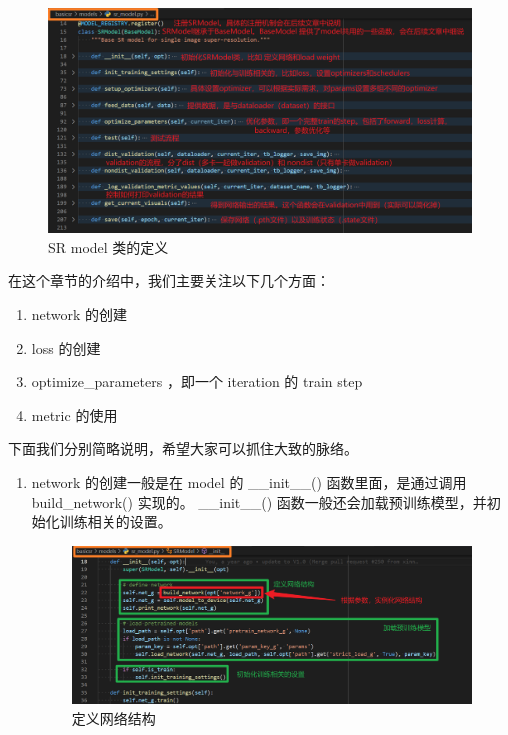 \documentclass[../main.tex]{subfiles}
\begin{document}
\begin{enumerate}
\begin{figure}[H]
\begin{center}
    \includegraphics[width=0.7\linewidth]{figures/getting_start_13.png}
    \caption{SR model 类的定义}
    \label{fig:getting_start_13}
\end{center}
\vspace{-0.5cm}
\end{figure}

在这个章节的介绍中，我们主要关注以下几个方面：

\begin{enumerate}
\item network 的创建
\item loss 的创建
\item optimize\_parameters ，即一个 iteration 的 train step
\item metric 的使用
\end{enumerate}

下面我们分别简略说明，希望大家可以抓住大致的脉络。

\begin{enumerate}

\item network 的创建一般是在 model 的 \_\_init\_\_() 函数里面，是通过调用 build\_network() 实现的。 \_\_init\_\_() 函数一般还会加载预训练模型，并初始化训练相关的设置。

\begin{figure}[H]
\begin{center}
    \includegraphics[width=0.7\linewidth]{figures/getting_start_14.png}
    \caption{定义网络结构}
    \label{fig:getting_start_14}
\end{center}
\vspace{-0.5cm}
\end{figure}


\end{enumerate}
\end{enumerate}
\end{document}
